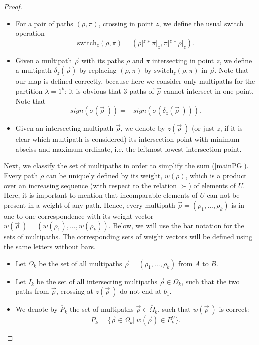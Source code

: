 \documentclass{article}
\theoremstyle{plain}
\theoremstyle{definition}
\begin{document}
\begin{proof}
\begin{itemize}
\item For a pair of paths $(\rho,\pi)$, crossing in point $z$, we define the usual switch operation $$\text{switch}_z(\rho,\pi) = (\rho|^z*\pi|_z,\pi|^z*\rho|_z ).$$

\item Given a multipath $\vec{\rho}$ with its paths $\rho$ and $\pi$ intersecting in point $z$, we define a multipath $\delta_z(\vec{\rho})$ by replacing $(\rho,\pi)$ by $\text{switch}_z(\rho,\pi)$ in $\vec{\rho}$. Note that our map is defined correctly, because here we consider only multipaths for the partition $\lambda=1^k$: it is obvious that 3 paths of $\vec{\rho}$ cannot intersect in one point. 
Note that $$sign(\sigma({\vec{\rho}}\ ))=-sign(\sigma({\delta_{z}(\vec{\rho}\ )})).$$

\item Given an intersecting multipath $\vec{\rho}$, we denote by $z(\vec{\rho}\ )$ (or just $z$, if it is clear which multipath is considered) its intersection point with minimum absciss and maximum ordinate, i.e. the leftmost lowest intersection point. 

\end{itemize}

Next, we classify the set of multipaths in order to simplify the sum (\ref{mainPG}).
Every path $\rho$ can be uniquely defined by its weight, $w(\rho)$, which is a product over an increasing sequence (with respect to the relation $\succ$) of elements of $U$. Here, it is important to mention that incomparable elements of $U$ can not be present in a weight of any path. Hence, every multipath $\vec{\rho}=(\rho_1,...,\rho_k)$ is in one to one correspondence with its weight vector $w(\vec{\rho}\ )=(w(\rho_1),...,w(\rho_k))$.
Below, we will use the bar notation for the sets of multipaths. The corresponding sets of weight vectors will be defined using the same letters without bars. 
\begin{itemize}

\item Let $\overline{\Omega}_k$ be the set of all multipaths $\vec{\rho}=(\rho_1,...,\rho_k)$ from $A$ to $B$.

\item Let $\overline{I}_k$ be the set of all intersecting multipaths  $\vec{\rho}\in\overline{\Omega}_k$, such that the two paths from $\vec{\rho}$,
  crossing at $z(\vec{\rho}\ )$ do not end at $b_1$.

\item We denote by $\overline{P}_k$ the set of multipaths $\vec{\rho}\in\overline{\Omega}_k$, such that $w(\vec{\rho}\ )$ is correct: $$\overline{P}_k=\{\vec{\rho}\in \overline{\Omega}_k|\ w(\vec{\rho})\in P^U_k\}.$$


\end{itemize}
\end{proof}
\end{document}
